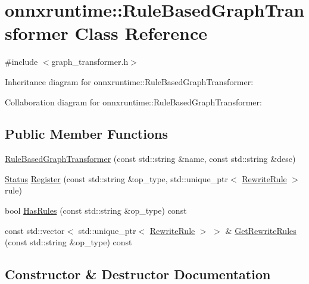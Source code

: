 \hypertarget{classonnxruntime_1_1RuleBasedGraphTransformer}{}\section{onnxruntime\+:\+:Rule\+Based\+Graph\+Transformer Class Reference}
\label{classonnxruntime_1_1RuleBasedGraphTransformer}


{\ttfamily \#include $<$graph\+\_\+transformer.\+h$>$}



Inheritance diagram for onnxruntime\+:\+:Rule\+Based\+Graph\+Transformer\+:


Collaboration diagram for onnxruntime\+:\+:Rule\+Based\+Graph\+Transformer\+:
\subsection*{Public Member Functions}
\begin{DoxyCompactItemize}
\item 
\mbox{\hyperlink{classonnxruntime_1_1RuleBasedGraphTransformer_a06da39482c0ef903b602cfdcba89387c}{Rule\+Based\+Graph\+Transformer}} (const std\+::string \&name, const std\+::string \&desc)
\item 
\mbox{\hyperlink{classonnxruntime_1_1common_1_1Status}{Status}} \mbox{\hyperlink{classonnxruntime_1_1RuleBasedGraphTransformer_a829ec095108f9fc3fd5863eeee1e4f5a}{Register}} (const std\+::string \&op\+\_\+type, std\+::unique\+\_\+ptr$<$ \mbox{\hyperlink{classonnxruntime_1_1RewriteRule}{Rewrite\+Rule}} $>$ rule)
\item 
bool \mbox{\hyperlink{classonnxruntime_1_1RuleBasedGraphTransformer_a881cf20384e8ed66fce914b4908d4eb4}{Has\+Rules}} (const std\+::string \&op\+\_\+type) const
\item 
const std\+::vector$<$ std\+::unique\+\_\+ptr$<$ \mbox{\hyperlink{classonnxruntime_1_1RewriteRule}{Rewrite\+Rule}} $>$ $>$ \& \mbox{\hyperlink{classonnxruntime_1_1RuleBasedGraphTransformer_af76b962a3244353152d6e5b2b181be9f}{Get\+Rewrite\+Rules}} (const std\+::string \&op\+\_\+type) const
\end{DoxyCompactItemize}


\subsection{Constructor \& Destructor Documentation}
\mbox{\label{classonnxruntime_1_1RuleBasedGraphTransformer_a06da39482c0ef903b602cfdcba89387c}} 
